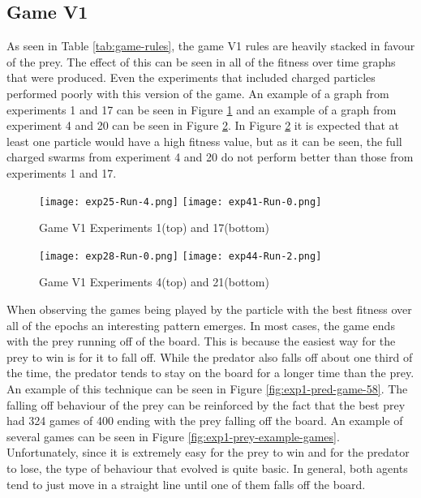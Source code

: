 \subsection{Game V1}
As seen in Table \ref{tab:game-rules}, the game V1 rules are heavily stacked in favour of the prey. The effect of this can be seen in all of the fitness over time graphs that were produced. Even the experiments that included charged particles performed poorly with this version of the game. An example of a graph from experiments 1 and 17 can be seen in Figure \ref{fig:v1-no-charged-graphs} and an example of a graph from experiment 4 and 20 can be seen in Figure \ref{fig:v1-fully-charged-graphs}. In Figure \ref{fig:v1-fully-charged-graphs} it is expected that at least one particle would have a high fitness value, but as it can be seen, the full charged swarms from experiment 4 and 20 do not perform better than those from experiments 1 and 17.

\begin{figure}
  \centering
  \texttt{[image: exp25-Run-4.png]}  
  \texttt{[image: exp41-Run-0.png]}
  \caption{Game V1 Experiments 1(top) and 17(bottom)}
  \label{fig:v1-no-charged-graphs}
\end{figure}


\begin{figure}
  \centering
  \texttt{[image: exp28-Run-0.png]}  
  \texttt{[image: exp44-Run-2.png]}
  \caption{Game V1 Experiments 4(top) and 21(bottom)}
  \label{fig:v1-fully-charged-graphs}
\end{figure}

When observing the games being played by the particle with the best fitness over all of the epochs an interesting pattern emerges. In most cases, the game ends with the prey running off of the board. This is because the easiest way for the prey to win is for it to fall off. While the predator also falls off about one third of the time, the predator tends to stay on the board for a longer time than the prey. An example of this technique can be seen in Figure \ref{fig:exp1-pred-game-58}. The falling off behaviour of the prey can be reinforced by the fact that the best prey had 324 games of 400 ending with the prey falling off the board. An example of several games can be seen in Figure \ref{fig:exp1-prey-example-games}. Unfortunately, since it is extremely easy for the prey to win and for the predator to lose, the type of behaviour that evolved is quite basic. In general, both agents tend to just move in a straight line until one of them falls off the board.


